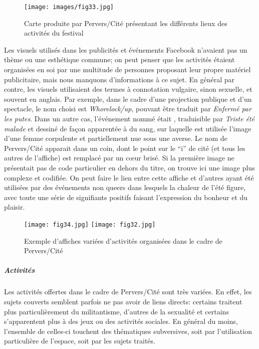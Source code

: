 \begin{figure}[ht]
	\centering
	\texttt{[image: images/fig33.jpg]}
	\caption{Carte produite par Pervers/Cité présentant les différents lieux des activités du festival}\label{fig:carte_perverscite}
\end{figure}

Les visuels utilisés dans les publicités et événements Facebook n'avaient pas un thème ou une esthétique commune; on peut penser que les activités étaient organisées en soi par une multitude de personnes proposant leur propre matériel publicitaire, mais nous manquons d'informations à ce sujet.
En général par contre, les visuels utilisaient des termes à connotation vulgaire, sinon sexuelle, et souvent en anglais.
Par exemple, dans le cadre d'une projection publique et d'un spectacle, le nom choisi est \emph{Whorelock/up}, pouvant être traduit par \emph{Enfermé par les putes}.
Dans un autre cas, l'événement nommé était , traduisible par \emph{Triste été malade} et dessiné de façon apparentée à du sang, sur laquelle est utilisée l'image d'une femme corpulente et partiellement nue sous une averse.
Le nom de Pervers/Cité apparait dans un coin, dont le point sur le \enquote{i} de cité (et tous les autres de l'affiche) est remplacé par un cœur brisé.
Si la première image ne présentait pas de code particulier en dehors du titre, on trouve ici une image plus complexe et codifiée.
On peut faire le lien entre cette affiche et d'autres ayant été utilisées par des événements non queers dans lesquels la chaleur de l'été figure, avec toute une série de signifiants positifs faisant l'expression du bonheur et du plaisir.

\begin{figure}
\centering
{}
{\texttt{[image: fig34.jpg]}}
{\texttt{[image: fig32.jpg]}}
\caption{Exemple d'affiches variées d'activités organisées dans le cadre de Pervers/Cité}\label{figs3132}
\end{figure}

\subparagraph{Activités}
\label{subsec:activitesperverscite}
Les activités offertes dans le cadre de Pervers/Cité sont très variées.
En effet, les sujets couverts semblent parfois ne pas avoir de liens directs: certains traitent plus particulièrement du militantisme, d'autres de la sexualité et certains s'apparentent plus à des jeux ou des activités sociales.
En général du moins, l'ensemble de celles-ci touchent des thématiques subversives, soit par l'utilisation particulière de l'espace, soit par les sujets traités.

